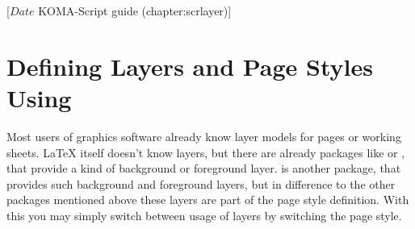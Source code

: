%
%
%
%
%
%
%
%
% 
%
%
%
%

                 [$Date$
                  KOMA-Script guide (chapter:scrlayer)]



\chapter[{Defining Layers and Page Styles Using \Package{scrlayer}}]%
{Defining Layers and Page Styles Using %
}


Most users of graphics software already know layer models for pages or working
sheets. \LaTeX{} itself doesn't know layers, but there are already packages
like  or , that provide a kind of
background or foreground layer.  is another package,
that provides such background and foreground layers, but in difference
to the other packages mentioned above these layers are part of the
page style definition. With this you may simply switch between usage
of layers by switching the page style.

